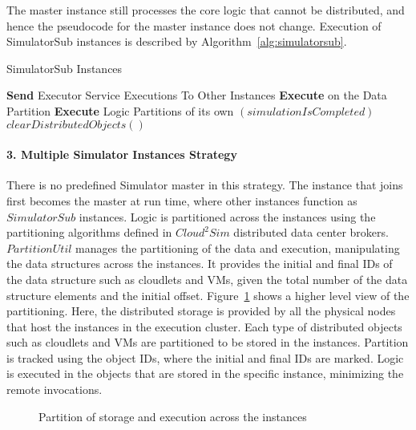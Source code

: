 The master instance still processes the core logic that cannot be distributed, and hence the pseudocode for the master instance does not change. Execution of SimulatorSub instances is described by Algorithm~\ref{alg:simulatorsub}.
\begin{algorithm}
  \caption{SimulatorSub Instances}
\label{alg:simulatorsub}
  \begin{algorithmic}
\Repeat
{}
\State \textbf{Send} Executor Service Executions To Other Instances
\State \textbf{Execute} on the Data Partition
\State \textbf{Execute} Logic Partitions of its own
\EndWhile
\Until $(simulationIsCompleted)$
\State $clearDistributedObjects()$ 
  \end{algorithmic}
\end{algorithm}

\paragraph*{3. Multiple Simulator Instances Strategy}
There is no predefined Simulator master in this strategy. The instance that joins first becomes the master at run time, where other instances function as $SimulatorSub$ instances. Logic is partitioned across the instances using the partitioning algorithms defined in $Cloud^{2}Sim$ distributed data center brokers. $PartitionUtil$ manages the partitioning of the data and execution, manipulating the data structures across the instances. It provides the initial and final IDs of the data structure such as cloudlets and VMs, given the total number of the data structure elements and the initial offset. Figure~\ref{fig:partition} shows a higher level view of the partitioning. Here, the distributed storage is provided by all the physical nodes that host the instances in the execution cluster. Each type of distributed objects such as cloudlets and VMs are partitioned to be stored in the instances. Partition is tracked using the object IDs, where the initial and final IDs are marked. Logic is executed in the objects that are stored in the specific instance, minimizing the remote invocations.

\begin{figure}[!htbp]
\begin{center}
\end{center}
 \caption{Partition of storage and execution across the instances}
 \label{fig:partition}
\end{figure}

